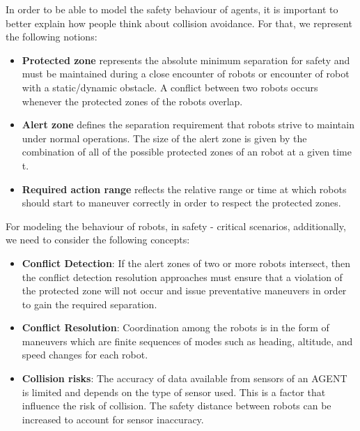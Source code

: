 \documentclass[journal]{IEEEtran}
\theoremstyle{definition}
\begin{document}
In order to be able to model the safety behaviour of agents, it is important to better explain how people think about collision avoidance. For that, we represent the following notions:
\begin{itemize}
\item \textbf{Protected zone} represents the absolute minimum separation for safety and must be maintained during a close encounter of robots or encounter of robot with a static/dynamic obstacle. A conflict between two robots occurs whenever the protected zones of the robots overlap. 
\item \textbf{Alert zone} defines the separation requirement that robots strive to maintain under normal operations. The size of the alert zone is given by the combination of all of the possible protected zones of an robot at a given time t.
\item \textbf{Required action range} reflects the relative range or time at which robots should start to maneuver correctly in order to respect the protected zones. 	
\end{itemize}
			 	 	 		
For modeling the behaviour of robots, in safety - critical scenarios, additionally, we need to consider the following concepts:
\begin{itemize}
\item \textbf{Conflict Detection}: If the alert zones of two or more robots intersect, then the conflict detection resolution approaches must ensure that a violation of the protected zone will not occur and issue preventative maneuvers in order to gain the required separation.
\item \textbf{Conflict Resolution}: Coordination among the robots is in the form of maneuvers which are finite sequences of modes such as heading, altitude, and speed changes for each robot. 
\item \textbf{Collision risks}: The accuracy of data available from sensors of an AGENT is limited and depends on the type of sensor used. This is a factor that influence the risk of collision. The safety distance between robots can be increased to account for sensor inaccuracy.
\end{itemize}


\end{document}
